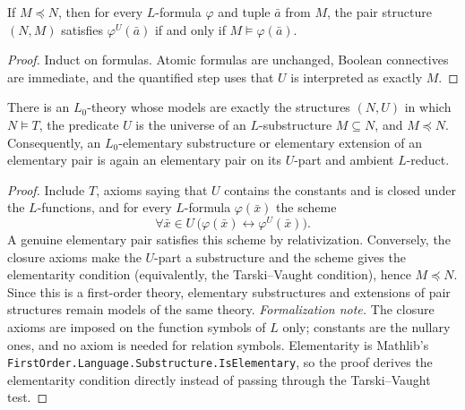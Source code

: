 \begin{lemma}
\label{lem:pair-relativization}
\leanok
{}
If \(M\preceq N\), then for every \(L\)-formula \(\varphi\) and tuple
\(\bar a\) from \(M\), the pair structure \((N,M)\) satisfies
\(\varphi^U(\bar a)\) if and only if \(M\models\varphi(\bar a)\).
\end{lemma}

\begin{proof}
Induct on formulas.  Atomic formulas are unchanged, Boolean connectives
are immediate, and the quantified step uses that \(U\) is interpreted
as exactly \(M\).
\end{proof}

\begin{lemma}
\label{lem:elementary-pair-axiomatization}
\leanok
{}
There is an \(L_0\)-theory whose models are exactly the structures
\((N,U)\) in which \(N\models T\), the predicate \(U\) is the universe
of an \(L\)-substructure \(M\subseteq N\), and \(M\preceq N\).
Consequently, an \(L_0\)-elementary substructure or elementary extension
of an elementary pair is again an elementary pair on its \(U\)-part and
ambient \(L\)-reduct.
\end{lemma}

\begin{proof}
Include \(T\), axioms saying that \(U\) contains the constants and is
closed under the \(L\)-functions, and for every \(L\)-formula
\(\varphi(\bar x)\) the scheme
\[
  \forall \bar x\in U\,
  \bigl(\varphi(\bar x)\leftrightarrow\varphi^U(\bar x)\bigr).
\]
A genuine elementary pair satisfies this scheme by relativization.
Conversely, the closure axioms make the \(U\)-part a substructure and
the scheme gives the elementarity condition (equivalently, the
Tarski--Vaught condition), hence \(M\preceq N\).
Since this is a first-order theory, elementary substructures and
extensions of pair structures remain models of the same theory.
\emph{Formalization note.}  The closure axioms are imposed on the
function symbols of \(L\) only; constants are the nullary ones, and no
axiom is needed for relation symbols.  Elementarity is Mathlib's
\texttt{FirstOrder.Language.Substructure.IsElementary}, so the proof
derives the elementarity condition directly instead of passing through
the Tarski--Vaught test.
\end{proof}


